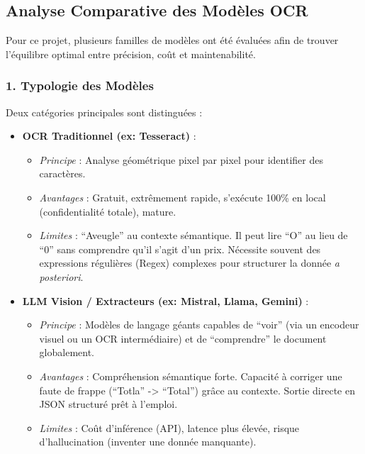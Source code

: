 \documentclass[
  letterpaper,
  DIV=11,
  numbers=noendperiod]{scrartcl}
\providecommand{\tightlist}{%
  \setlength{\itemsep}{0pt}\setlength{\parskip}{0pt}}
\begin{document}
\subsection{Analyse Comparative des Modèles
OCR}\label{analyse-comparative-des-moduxe8les-ocr}

Pour ce projet, plusieurs familles de modèles ont été évaluées afin de
trouver l'équilibre optimal entre précision, coût et maintenabilité.

\subsubsection{1. Typologie des Modèles}\label{typologie-des-moduxe8les}

Deux catégories principales sont distinguées :

\begin{itemize}
\tightlist
\item
  \textbf{OCR Traditionnel (ex: Tesseract)} :

  \begin{itemize}
  \tightlist
  \item
    \emph{Principe} : Analyse géométrique pixel par pixel pour
    identifier des caractères.
  \item
    \emph{Avantages} : Gratuit, extrêmement rapide, s'exécute 100\% en
    local (confidentialité totale), mature.
  \item
    \emph{Limites} : ``Aveugle'' au contexte sémantique. Il peut lire
    ``O'' au lieu de ``0'' sans comprendre qu'il s'agit d'un prix.
    Nécessite souvent des expressions régulières (Regex) complexes pour
    structurer la donnée \emph{a posteriori}.
  \end{itemize}
\item
  \textbf{LLM Vision / Extracteurs (ex: Mistral, Llama, Gemini)} :

  \begin{itemize}
  \tightlist
  \item
    \emph{Principe} : Modèles de langage géants capables de ``voir''
    (via un encodeur visuel ou un OCR intermédiaire) et de
    ``comprendre'' le document globalement.
  \item
    \emph{Avantages} : Compréhension sémantique forte. Capacité à
    corriger une faute de frappe (``Totla'' -\textgreater{} ``Total'')
    grâce au contexte. Sortie directe en JSON structuré prêt à l'emploi.
  \item
    \emph{Limites} : Coût d'inférence (API), latence plus élevée, risque
    d'hallucination (inventer une donnée manquante).
  \end{itemize}
\end{itemize}
\end{document}
